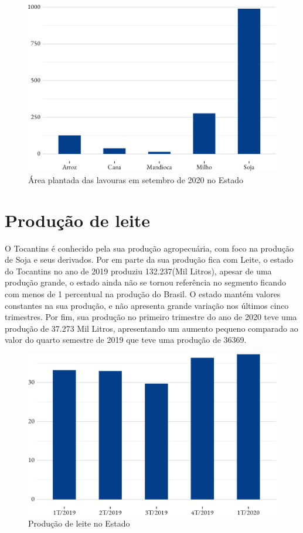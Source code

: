 \begin{figure}[h]
	\caption{Área plantada das lavouras em setembro de 2020 no Estado}
	\includegraphics{fig/area_plantada-1.pdf}
\end{figure}

\section{Produção de leite}
\par O Tocantins é conhecido pela sua produção agropecuária, com foco na produção de Soja e seus derivados. Por em parte da sua produção fica com Leite, o estado do Tocantins no ano de 2019 produziu 132.237(Mil Litros), apesar de uma produção grande, o estado ainda não se tornou referência no segmento ficando com menos de 1 percentual na produção do Brasil. O estado mantém valores constantes na sua produção, e não apresenta grande variação nos últimos cinco trimestres. Por fim, sua produção no primeiro trimestre do ano de 2020 teve uma produção de 37.273 Mil Litros, apresentando um aumento pequeno comparado ao valor do quarto semestre de 2019 que teve uma produção de 36369. 

\begin{figure}[h]
	\caption{Produção de leite no Estado}
	\includegraphics{fig/prod_leite-1.pdf}
\end{figure}

